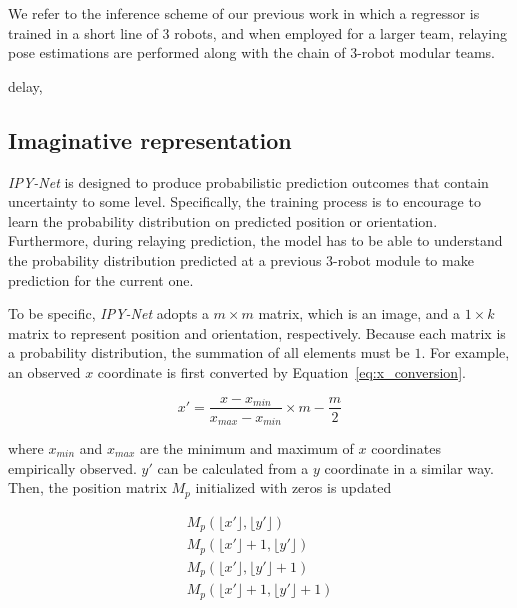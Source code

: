 \documentclass[letterpaper, 10 pt, conference]{ieeeconf}  %
\begin{document}
	We refer to the inference scheme of our previous work \cite{CPR17} in which 
	a regressor is trained in a short line of $3$ robots, and when employed for a larger team, 
	relaying pose estimations are performed along with the chain of $3$-robot modular teams. 
	
	delay, 


	\subsection{Imaginative representation} 
	\label{sec:imaginative_representation}
	
	\emph{IPY-Net} is designed to produce probabilistic prediction outcomes that contain 
	uncertainty to some level. Specifically, the training process is to encourage to learn 
	the probability distribution on predicted position or orientation. 
	Furthermore, during relaying prediction, the model has to be able to understand 
	the probability distribution predicted at a previous $3$-robot module to 
	make prediction for the current one.  
	
	To be specific, \emph{IPY-Net} adopts a $m \times m$ matrix, which is an image, and 
	a $1 \times k$ matrix to represent position and orientation, respectively. Because  
	each matrix is a probability distribution, the summation of all elements must be $1$. 
	For example, an observed $x$ coordinate is first converted by Equation~\ref{eq:x_conversion}.
	
	\begin{equation}
	\label{eq:x_conversion}
		x' = \frac{x - x_{min}}{x_{max} - x_{min}} \times m - \frac{m}{2}
	\end{equation}
	
	where $x_{min}$ and $x_{max}$ are the minimum and maximum of $x$ coordinates
	empirically observed. $y'$ can be calculated from a $y$ coordinate in a similar way. 
	Then, the position matrix $M_p$ initialized with zeros is updated 
	
	\begin{equation}
		\begin{aligned}
		M_{p}(\lfloor{x'}\rfloor, \lfloor{y'}\rfloor) \\
		M_{p}(\lfloor{x'}\rfloor+1, \lfloor{y'}\rfloor) \\
		M_{p}(\lfloor{x'}\rfloor, \lfloor{y'}\rfloor+1) \\
		M_{p}(\lfloor{x'}\rfloor+1, \lfloor{y'}\rfloor+1) 
		\end{aligned}
	\end{equation} 
	
\end{document}
